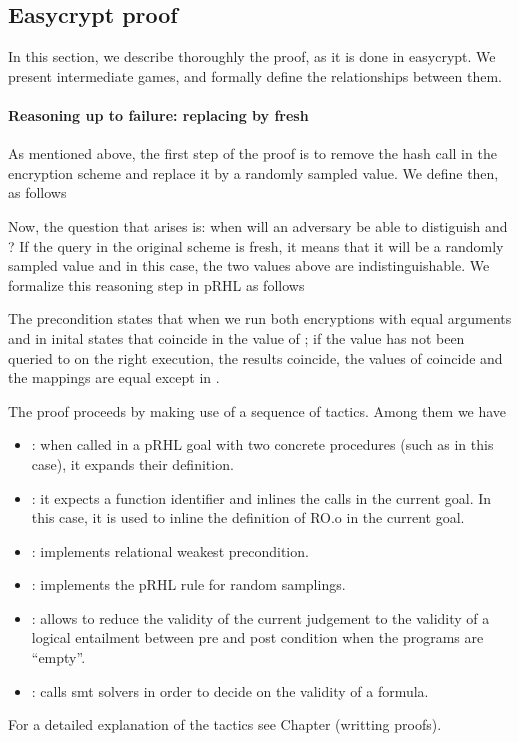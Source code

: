 \subsection{Easycrypt proof}
In this section, we describe thoroughly the proof, as it is done in
easycrypt. We present intermediate games, and formally define the
relationships between them.

\paragraph{Reasoning up to failure: replacing  by fresh }
As mentioned above, the first step of the proof is to remove the hash
call in the encryption scheme and replace it by a randomly sampled
value. We define  then, as follows


Now, the question that arises is: when will an adversary be able to
distiguish  and ? %
If the query in the original scheme is fresh, it means that it will be
a randomly sampled value and in this case, the two values above are
indistinguishable. We formalize this reasoning step in pRHL as follows


The precondition states that when we run both encryptions with equal
arguments  and in inital states that coincide in the value
of ; if the value  has not been queried to
 on the right execution, the results coincide, the values of
 coincide and the mappings  are equal except in
.

The proof proceeds by making use of a sequence of tactics. Among them
we have
\begin{itemize}
\item {}: when called in a pRHL goal with two concrete
  procedures (such as in this case), it expands their definition. 
\item {}: it expects a function identifier and inlines the
  calls in the current goal. In this case, it is used to inline the
  definition of RO.o in the current goal.
\item {}: implements relational weakest precondition.
\item {}: implements the pRHL rule for random samplings.
\item {}: allows to reduce the validity of the current
  judgement to the validity of a logical entailment between pre and
  post condition when the programs are ``empty''.
\item {}: calls smt solvers in order to decide on the validity
  of a formula.
\end{itemize} 
For a detailed explanation of the tactics see Chapter (writting proofs).

